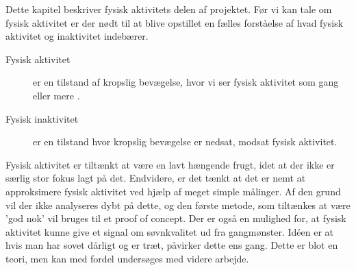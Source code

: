 Dette kapitel beskriver fysisk aktivitets delen af projektet.
Før vi kan tale om fysisk aktivitet er der nødt til at blive opstillet en fælles forståelse af hvad fysisk aktivitet og inaktivitet indebærer.
\begin{description}
\item[Fysisk aktivitet] er en tilstand af kropslig bevægelse, hvor vi ser fysisk aktivitet som gang eller mere \citep{misc:PhysicalActivity}.
\item[Fysisk inaktivitet] er en tilstand hvor kropslig bevægelse er nedsat, modsat fysisk aktivitet.
\end{description}

Fysisk aktivitet er tiltænkt at være en lavt hængende frugt, idet at der ikke er særlig stor fokus lagt på det.
Endvidere, er det tænkt at det er nemt at approksimere fysisk aktivitet ved hjælp af meget simple målinger.
Af den grund vil der ikke analyseres dybt på dette, og den første metode, som tiltænkes at være 'god nok' vil bruges til et proof of concept.
Der er også en mulighed for, at fysisk aktivitet kunne give et signal om søvnkvalitet ud fra gangmønster.
Idéen er at hvis man har sovet dårligt og er træt, påvirker dette ens gang.
Dette er blot en teori, men kan med fordel undersøges med videre arbejde.